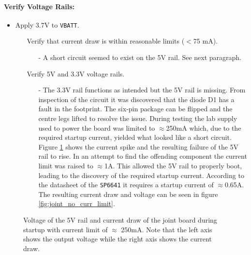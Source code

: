 \paragraph{Verify Voltage Rails:} %
 \label{par:verify_voltage_rails}
 \begin{itemize}
 	\item Apply 3.7V to \texttt{VBATT}.
 	\begin{itemize}
 		\item[\xmark] Verify that current draw is within reasonable limits ($<$75 mA).
 		\begin{itemize}
 			\item[-] A short circuit seemed to exist on the 5V rail.
 			See next paragraph.
 		\end{itemize}
 		\item[\xmark] Verify 5V and 3.3V voltage rails.
 		\begin{itemize}
 			\item[-] The 3.3V rail functions as intended but the 5V rail is missing.
 			From inspection of the circuit it was discovered that the diode D1 has a fault in the footprint.
 			The six-pin package can be flipped and the centre legs lifted to resolve the issue.
 			During testing the lab supply used to power the board was limited to $\approx$250mA which, due to the required startup current, yielded what looked like a short circuit.
 			Figure \ref{fig:joint_curr_limit} shows the current spike and the resulting failure of the 5V rail to rise.
 			In an attempt to find the offending component the current limit was raised to $\approx$1A.
 			This allowed the 5V rail to properly boot, leading to the discovery of the required startup current.
 			According to the datasheet of the \texttt{SP6641} \cite{sp6641b} it requires a startup current of $\approx$0.65A. 
 			The resulting current draw and voltage can be seen in figure \ref{fig:joint_no_curr_limit}.
 		\end{itemize}
 	\end{itemize}
 \end{itemize}
 
\begin{figure}[h]
	\centering
	\caption[Voltages and current of 5V converter with current limit]{Voltage of the 5V rail and current draw of the joint board during startup with current limit of $\approx$ 250mA. Note that the left axis shows the output voltage while the right axis shows the current draw.}
	\label{fig:joint_curr_limit}
\end{figure}

